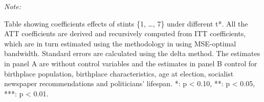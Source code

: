 \begin{table}[!h]
\begin{threeparttable}
\begin{tablenotes}[para]
\item \textit{Note: } 
\item Table showing coefficients effects of stints \{1, \dots, 7\} under different t*. All the ATT coefficients are derived and recursively computed from ITT coefficients, which are in turn estimated using the methodology in \citep{cattaneo2019practical} using MSE-optimal bandwidth. Standard errors are calculated using the delta method. The estimates in panel A are without control variables and the estimates in panel B control for birthplace population, birthplace characteristics, age at election, socialist newspaper recommendations and politicians' lifespan. *: p < 0.10, **: p < 0.05, ***: p < 0.01. 
\end{tablenotes}
\end{threeparttable}
\end{table}
